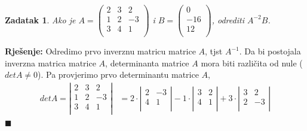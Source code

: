 \documentclass{article}
\newtheorem{theorem}{\textbf{Zadatak}}
\newenvironment{solution}{\noindent\textbf{Rje\v senje:\newline}}{$\blacksquare$}
\begin{document}
\begin{theorem}
    Ako je
        \(A=\left(
        \begin{array}{ccc}
            2 & 3 & 2 \\
            1 & 2 & -3 \\
            3 & 4 & 1 \\
        \end{array}
        \right)\)
    i
    \(B=\left(
    \begin{array}{c}
        0 \\
        -16 \\
        12 \\
    \end{array}
    \right)\),
    odrediti $A^{-2}B$.
\end{theorem}

\begin{solution}
    Odredimo prvo inverznu matricu matrice $A$, tjst $A^{-1}$.
    Da bi postojala inverzna matrica matrice $A$, determinanta matrice $A$ mora biti razli\v cita od nule ($detA\neq 0$).
    Pa provjerimo prvo determinantu matrice $A$,
    \newline
    \begin{equation*}
        \begin{aligned}
            detA=\left|
        \begin{array}{ccc}
            2 & 3 & 2 \\
            1 & 2 & -3 \\
            3 & 4 & 1 \\
        \end{array}
        \right|
        &=2\cdot \left|
        \begin{array}{cc}
            2 & -3 \\
            4 & 1 \\
        \end{array}
        \right| -
        1\cdot \left|
        \begin{array}{cc}
            3 & 2 \\
            4 & 1 \\
        \end{array}
        \right| +
        3\cdot \left|
        \begin{array}{cc}
            3 & 2 \\
            2 & -3 \\
        \end{array}
        \right|\\

\end{aligned}
\end{equation*}
\end{solution}
\end{document}
